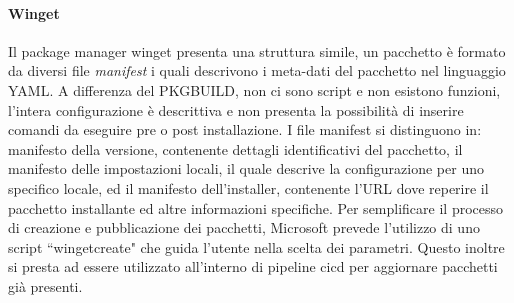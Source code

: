 \paragraph{Winget}\label{chap:winget} Il package manager winget presenta una struttura simile, un pacchetto è formato da diversi file \textit{manifest} i quali descrivono i meta-dati del pacchetto nel linguaggio YAML. A differenza del PKGBUILD, non ci sono script e non esistono funzioni, l'intera configurazione è descrittiva e non presenta la possibilità di inserire comandi da eseguire pre o post installazione. I file manifest si distinguono in: manifesto della versione, contenente dettagli identificativi del pacchetto, il manifesto delle impostazioni locali, il quale descrive la configurazione per uno specifico locale, ed il manifesto dell'installer, contenente l'URL dove reperire il pacchetto installante ed altre informazioni specifiche. Per semplificare il processo di creazione e pubblicazione dei pacchetti, Microsoft prevede l'utilizzo di uno script ``wingetcreate" che guida l'utente nella scelta dei parametri. Questo inoltre si presta ad essere utilizzato all'interno di pipeline \ac{cicd} per aggiornare pacchetti già presenti.

